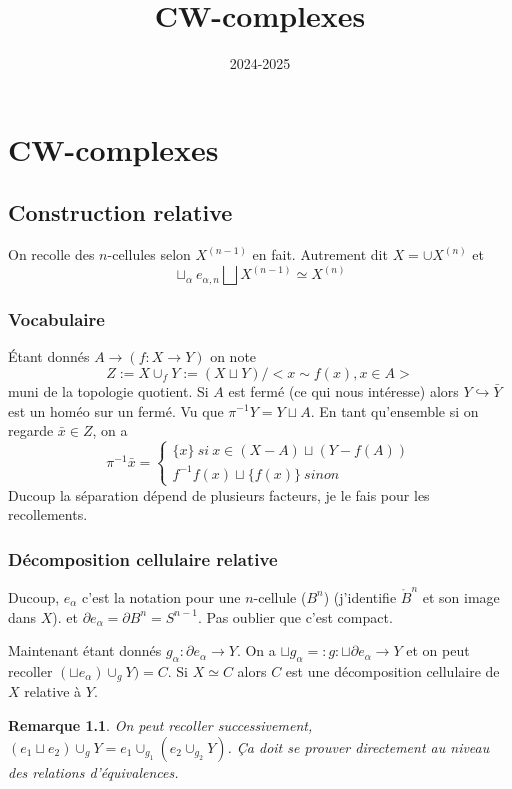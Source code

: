 \documentclass[a4paper,12pt]{book}
\title{CW-complexes}
\date{2024-2025}
\theoremstyle{plain}
\newtheorem{rem}{Remarque}
\theoremstyle{definition}
\theoremstyle{remark}
\begin{document}
\maketitle
\tableofcontents
\chapter{CW-complexes}
\section{Construction relative}
On recolle des $n$-cellules selon $X^{(n-1)}$ en fait.
Autrement dit $X=\cup X^{(n)}$ et 
\[\sqcup_\alpha e_{\alpha,n}\bigsqcup X^{(n-1)}\simeq X^{(n)}\]
\subsection{Vocabulaire}
Étant donnés $A\to (f\colon X\to Y)$ on note 
\[Z:=X\cup_f Y:=(X\sqcup Y)/<x\sim f(x), x\in A>\]
muni de la topologie quotient. Si $A$ est fermé
(ce qui nous intéresse)
alors $Y\hookrightarrow \bar Y$ est un homéo sur un fermé. Vu
que $\pi^{-1}Y=Y\sqcup A$.
En tant qu'ensemble si on regarde $\bar x\in Z$, on a 
\[\pi^{-1} \bar x=\begin{cases} \{x\}~si~x\in (X-A)\sqcup (Y-f(A))
\\ f^{-1}f(x)\sqcup \{f(x)\}~sinon\end{cases}\]
Ducoup la séparation dépend de plusieurs facteurs, je le fais 
pour les recollements.

\subsection{Décomposition cellulaire relative}
Ducoup, $e_\alpha$ c'est la notation pour une $n$-cellule ($B^n$)
(j'identifie $\mathring B^n$ et son image dans $X$).
et $\partial e_\alpha = \partial B^n=S^{n-1}$. Pas oublier que
c'est compact. 

Maintenant étant donnés $g_\alpha\colon \partial e_\alpha\to Y$.
On a $\sqcup g_\alpha=:g\colon \sqcup \partial e_\alpha \to Y$ et
on peut recoller $(\sqcup e_\alpha)\cup_g Y)=C$. Si $X\simeq C$
alors $C$ est une décomposition cellulaire de $X$ relative à $Y$.

\begin{rem}
  On peut recoller successivement, $(e_1\sqcup e_2)\cup_{g} Y=
  e_1\cup_{g_1}(e_2\cup_{g_2}Y)$. Ça doit se prouver directement
  au niveau des relations d'équivalences.
\end{rem}
\end{document}
